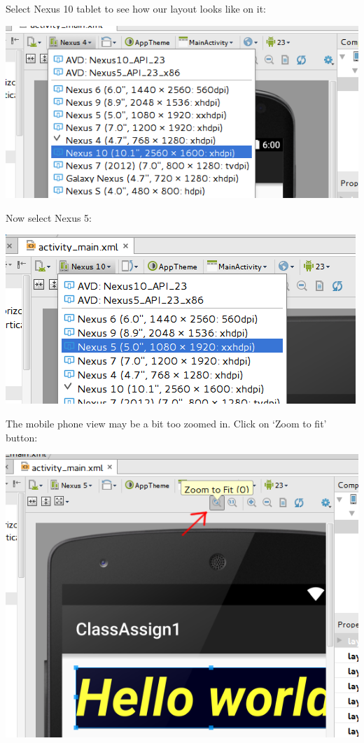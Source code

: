 Select Nexus 10 tablet to see how our layout looks like on it:

\begin{center}
	\includegraphics[scale=0.4]{chapters/ch02/images/19_nexus_10}
\end{center}

Now select Nexus 5:

\begin{center}
	\includegraphics[scale=0.4]{chapters/ch02/images/20_nexus_5}
\end{center}

The mobile phone view may be a bit too zoomed in. Click on `Zoom to fit' button:

\begin{center}
	\includegraphics[scale=0.4]{chapters/ch02/images/21_zoom}
\end{center}

